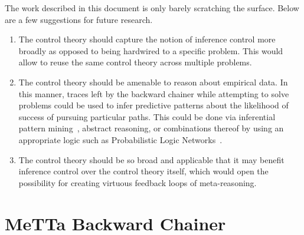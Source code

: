 \documentclass{easychair}
\begin{document}
The work described in this document is only barely scratching the
surface.  Below are a few suggestions for future research.
\begin{enumerate}
\item The control theory should capture the notion of inference
  control more broadly as opposed to being hardwired to a specific
  problem.  This would allow to reuse the same control theory across
  multiple problems.
\item The control theory should be amenable to reason about empirical
  data.  In this manner, traces left by the backward chainer while
  attempting to solve problems could be used to infer predictive
  patterns about the likelihood of success of pursuing particular
  paths.  This could be done via inferential pattern
  mining~\cite{TODO}, abstract reasoning, or combinations thereof by
  using an appropriate logic such as Probabilistic Logic
  Networks~\cite{TODO}.
\item The control theory should be so broad and applicable that it may
  benefit inference control over the control theory itself, which
  would open the possibility for creating virtuous feedback loops of
  meta-reasoning.
\end{enumerate}




\label{sect:bib}
%
%
%


\appendix
\section{MeTTa Backward Chainer}
\label{app:metta-backward-chainer}
\end{document}
